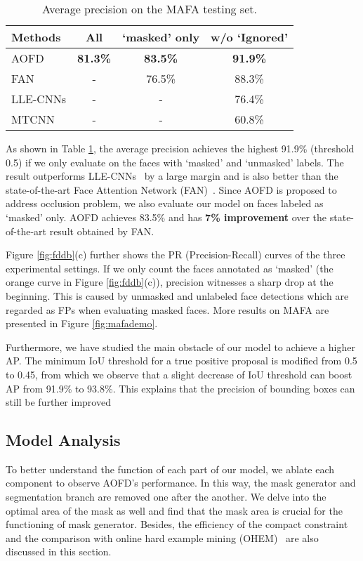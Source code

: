 \documentclass[10pt,twocolumn,letterpaper]{article}
\begin{document}
\begin{table}
	\renewcommand{\arraystretch}{1.5}
       \begin{center}
	\begin{tabular}{|l|c|c|c|}
		\hline
		Methods & All & `masked' only & w/o `Ignored' \\
		\hline\hline
		AOFD & \textbf{81.3\%} & \textbf{83.5\% } & \textbf{91.9\%} \\
		FAN & - & 76.5\% & 88.3\%\\
		LLE-CNNs & - & - & 76.4\%\\
		MTCNN & - & - & 60.8\%\\
		\hline
	\end{tabular}
	\end{center}
	\caption{Average precision on the MAFA testing set.}
	\label{tab:mafa}
\end{table}


As shown in Table \ref{tab:mafa}, the average precision achieves the highest 91.9\% (threshold 0.5) if we only evaluate on the faces with `masked' and `unmasked' labels. The result outperforms LLE-CNNs~\cite{ge2017detecting} by a large margin and is also better than the state-of-the-art Face Attention Network (FAN)~\cite{wang2017fan}. Since AOFD is proposed to address occlusion problem, we also evaluate our model on faces labeled as `masked' only. AOFD achieves 83.5\%  and has \textbf{7\% improvement} over the state-of-the-art result obtained by FAN.


Figure \ref{fig:fddb}(c) further shows the PR (Precision-Recall) curves of the three experimental settings. If we only count the faces annotated as `masked' (the orange curve in Figure \ref{fig:fddb}(c)), precision witnesses a sharp drop at the beginning. This is caused by unmasked and unlabeled face detections which are regarded as FPs when evaluating masked faces.
More results on MAFA are presented in Figure \ref{fig:mafademo}.



Furthermore, we have studied the main obstacle of our model to achieve a higher AP. The minimum IoU threshold for a true positive proposal is modified from 0.5 to 0.45, from which we observe that a slight decrease of IoU threshold can boost AP from 91.9\% to 93.8\%. This explains that the precision of bounding boxes can still be further improved 





\subsection{Model Analysis}
To better understand the function of each part of our model, we ablate each component to observe AOFD's performance. In this way, the mask generator and segmentation branch are removed one after the another. We delve into the optimal area of the mask as well and find that the mask area is crucial for the functioning of mask generator. Besides, the efficiency of the compact constraint and the comparison with online hard example mining (OHEM)~\cite{shrivastava2016training} are also discussed in this section.
\end{document}
